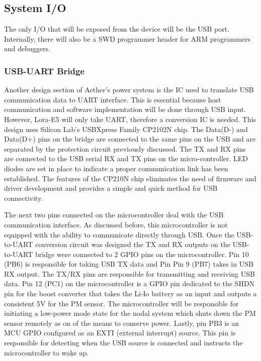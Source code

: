 \subsection{System I/O} \label{sec:sys-io}
The only I/O that will be exposed from the device will be the USB port. Internally, there will also
be a SWD programmer header for ARM programmers and debuggers.

\subsubsection{USB-UART Bridge}
Another design section of Aether's power system is the IC used to translate USB communication data
to UART interface. This is essential because host communication and software implementation will be
done through USB input. However, Lora-E5 will only take UART, therefore a conversion IC is needed.
This design uses Silicon Lab's USBXpress Family CP2102N chip. The Data(D-) and Data(D+) pins on the
bridge are connected to the same pins on the USB and are separated by the protection circuit
previously discussed. The TX and RX pins are connected to the USB serial RX and TX pins on the
micro-controller. LED diodes are set in place to indicate a proper communication link has been
established. The features of the CP210N chip eliminates the need of firmware and driver development
and provides a simple and quick method for USB connectivity.

The next two pins connected on the microcontroller deal with the USB communication interface. As
discussed before, this microcontroller is not equipped with the ability to communicate directly
through USB. Once the USB-to-UART conversion circuit was designed the TX and RX outputs on the
USB-to-UART bridge were connected to 2 GPIO pins on the microcontroller. Pin 10 (PB6) is responsible
for taking USB TX data and Pin Pin 9 (PB7) takes in USB RX output. The TX/RX pins are responsible
for transmitting and receiving USB data. Pin 12 (PC1) on the microcontroller is a GPIO pin dedicated
to the SHDN pin for the boost converter that takes the Li-Io battery as an input and outputs
a consistent 5V for the PM sensor. The microcontroller will be responsible for initiating
a low-power mode state for the nodal system which shuts down the PM sensor remotely as on of the
means to conserve power. Lastly, pin PB3 is an MCU GPIO configured as an EXTI (external interrupt)
source. This pin is responsible for detecting when the USB source is connected and instructs the
microcontroller to wake up. 

